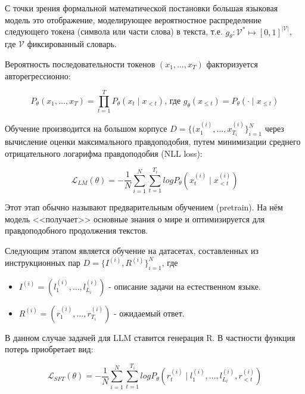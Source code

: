 С точки зрения формальной математической постановки большая языковая модель это отображение, моделирующее вероятностное распределение следующего токена (символа или части слова) в текста, т.е. $g_\theta: \mathcal V^{\!*} \mapsto [0, 1]^{|\mathcal V|}$, где $\mathcal V$ фиксированный словарь.

Вероятность последовательности токенов $(x_1, \ldots, x_{T})$ факторизуется авторегрессионно:

\begin{equation}
    P_{\theta}(x_1, \ldots, x_{T}) = \prod_{t=1}^{T} P_{\theta}(x_t \mid x_{<t}) \textit{, где $g_{\theta}(x_{\leq t}) = P_{\theta}(\cdot \mid x_{\leq t})$}
\end{equation}

Обучение производится на большом корпусе $D = \{(x_1^{(i)}, \ldots, x_{T_i}^{(i)}\}_{i=1}^{N}$ через вычисление оценки максимального правдоподобия, путем минимизации среднего отрицательного логарифма правдоподобия (NLL loss):

\begin{equation}
    \mathcal{L}_{LM}(\theta) = - \frac{1}{N} \sum_{i=1}^N \sum_{t=1}^{T_i} log P_{\theta}(x_t^{(i)} \mid x_{<t}^{(i)})
    \label{generative_loss}
\end{equation}

Этот этап обычно называют предварительным обучением (pretrain). На нём модель <<получает>> основные знания о мире и оптимизируется для правдоподобного продолжения текстов. 

Следующим этапом является обучение на датасетах, составленных из инструкционных пар $D = \{I^{(i)}, R^{(i)}\}_{i=1}^{N} \textit{, где}$ 

\begin{itemize}
    \item $I^{(i)} = (l_1^{(i)}, \ldots, l_{L_i}^{(i)})$ - описание задачи на естественном языке.

    \item $R^{(i)} = (r_1^{(i)}, \ldots, r_{T_i}^{(i)})$ - ожидаемый ответ.
\end{itemize}

В данном случае задачей для LLM ставится генерация R. В частности функция потерь приобретает вид:

\begin{equation}
    \mathcal{L}_{SFT}(\theta) = - \frac{1}{N} \sum_{i=1}^N \sum_{t=1}^{T_i} log P_{\theta}(r_t^{(i)} \mid l_1^{(i)}, \ldots, l_{L_i}^{(i)} ,r_{<t}^{(i)})
\end{equation}

